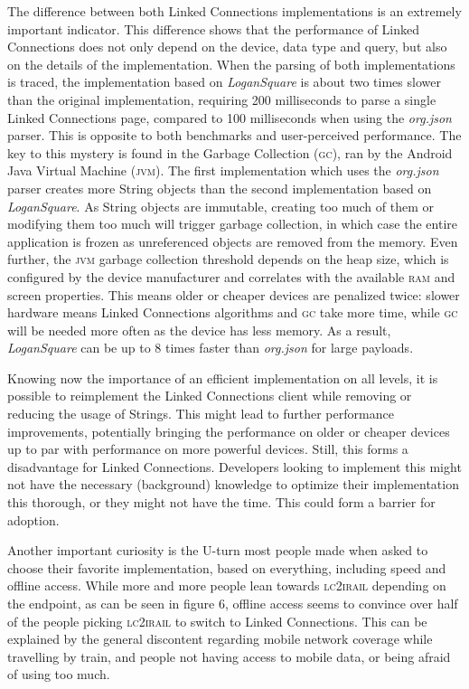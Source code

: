 \documentclass[twocolumn]{phdsymp} %
\begin{document}
The difference between both Linked Connections implementations is an extremely important indicator. This difference shows that the performance of Linked Connections
does not only depend on the device, data type and query, but also on the details of the implementation. When the parsing of both implementations is traced, the implementation based on \emph{LoganSquare} is about two times slower than the original implementation, requiring 200 milliseconds to parse a single Linked Connections page, compared to 100 milliseconds when using the \emph{org.json} parser. This is opposite to both benchmarks and user-perceived performance. The key to this mystery is found in the Garbage Collection (\textsc{gc}), ran by the Android Java Virtual Machine (\textsc{jvm}). The first implementation which uses the \emph{org.json} parser creates more String objects than the second implementation based on \emph{LoganSquare}. As String objects are immutable, creating too much of them or modifying them too much will trigger garbage collection, in which case the entire application is frozen as unreferenced objects are removed from the memory. Even further, the \textsc{jvm} garbage collection threshold depends on the heap size, which is configured by the device manufacturer and correlates with the available \textsc{ram} and screen properties. This
means older or cheaper devices are penalized twice: slower hardware means Linked Connections algorithms and \textsc{gc} take more time, while \textsc{gc} will be needed more often as the device has less memory. As a result, \emph{LoganSquare} can be up to 8 times faster than \emph{org.json} for large payloads.

Knowing now the importance of an efficient implementation on all levels, it is possible to reimplement the Linked Connections client while removing or reducing the usage of
Strings. This might lead to further performance improvements, potentially bringing the performance on older or cheaper devices up to par with performance on more powerful devices. Still, this forms a disadvantage for Linked Connections. Developers looking to implement this might not have the necessary (background) knowledge to optimize
their implementation this thorough, or they might not have the time. This could form a barrier for adoption.

Another important curiosity is the U-turn most people made when asked to choose their favorite implementation, based on everything, including speed and offline access.
While more and more people lean towards \textsc{lc2irail} depending on the endpoint, as can be seen in figure 6, offline access seems to convince over half of the people picking \textsc{lc2irail} to switch to Linked Connections. This can be explained by the general discontent regarding mobile network coverage while travelling by train, and people not having access to mobile data, or being afraid of using too much.
\end{document}
